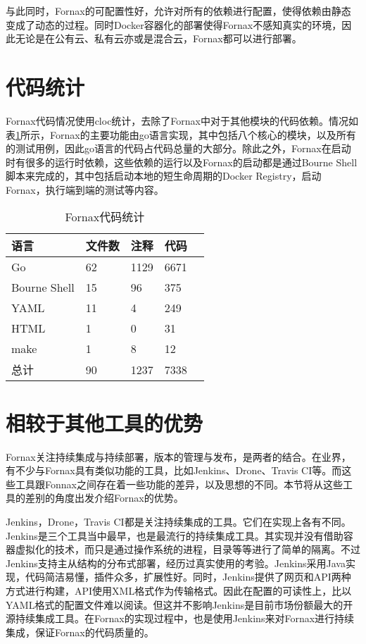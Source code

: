 与此同时，Fornax的可配置性好，允许对所有的依赖进行配置，使得依赖由静态变成了动态的过程。同时Docker容器化的部署使得Fornax不感知真实的环境，因此无论是在公有云、私有云亦或是混合云，Fornax都可以进行部署。


\section{代码统计}

Fornax代码情况使用cloc\cite{cloc}统计，去除了Fornax中对于其他模块的代码依赖。情况如表\ref{tab:code}所示，Fornax的主要功能由go语言实现，其中包括八个核心的模块，以及所有的测试用例，因此go语言的代码占代码总量的大部分。除此之外，Fornax在启动时有很多的运行时依赖，这些依赖的运行以及Fornax的启动都是通过Bourne Shell脚本来完成的，其中包括启动本地的短生命周期的Docker Registry，启动Fornax，执行端到端的测试等内容。

\begin{table}[!hpb]
  \centering
  \caption{Fornax代码统计}
  \label{tab:code}
  \begin{tabular}{lllll} \toprule
    语言 & 文件数 & 注释 & 代码 \\ \midrule
    Go & 62 & 1129 & 6671 \\
    Bourne Shell & 15 & 96 & 375 \\
    YAML & 11 & 4 & 249 \\
    HTML & 1 & 0 & 31 \\
    make & 1 & 8 & 12 \\
    总计 & 90 & 1237 & 7338 \\ \bottomrule
  \end{tabular}
\end{table}

\section{相较于其他工具的优势}

Fornax关注持续集成与持续部署，版本的管理与发布，是两者的结合。在业界，有不少与Fornax具有类似功能的工具，比如Jenkins、Drone、Travis CI等。而这些工具跟Fonnax之间存在着一些功能的差异，以及思想的不同。本节将从这些工具的差别的角度出发介绍Fornax的优势。

Jenkins，Drone，Travis CI都是关注持续集成的工具。它们在实现上各有不同。Jenkins是三个工具当中最早，也是最流行的持续集成工具。其实现并没有借助容器虚拟化的技术，而只是通过操作系统的进程，目录等等进行了简单的隔离。不过Jenkins支持主从结构的分布式部署，经历过真实使用的考验。Jenkins采用Java实现，代码简洁易懂，插件众多，扩展性好。同时，Jenkins提供了网页和API两种方式进行构建，API使用XML格式作为传输格式。因此在配置的可读性上，比以YAML格式的配置文件难以阅读。但这并不影响Jenkins是目前市场份额最大的开源持续集成工具。在Fornax的实现过程中，也是使用Jenkins来对Fornax进行持续集成，保证Fornax的代码质量的。

